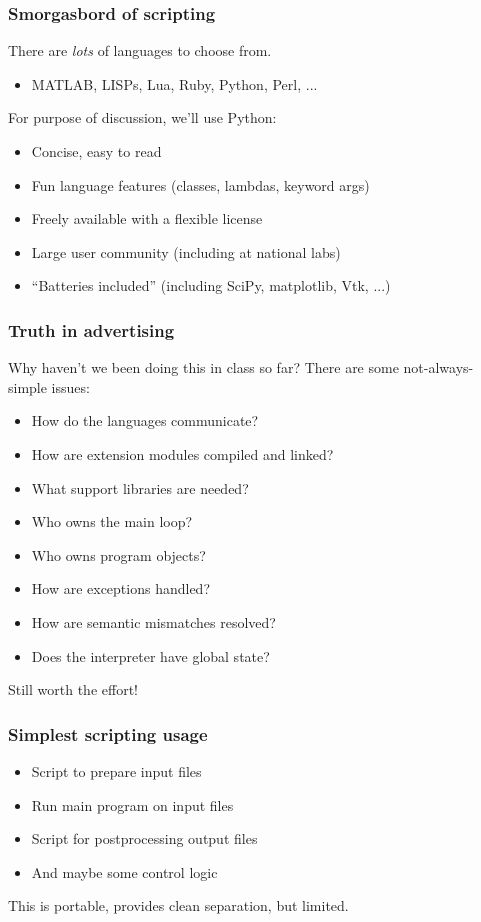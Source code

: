 \documentclass{beamer}
\begin{document}
\begin{frame}
  \frametitle{Smorgasbord of scripting}

  There are {\em lots} of languages to choose from.
  \begin{itemize}
  \item MATLAB, LISPs, Lua, Ruby, Python, Perl, ...
  \end{itemize}

  \vspace{1cm}
  For purpose of discussion, we'll use Python:
  \begin{itemize}
  \item Concise, easy to read
  \item Fun language features (classes, lambdas, keyword args)
  \item Freely available with a flexible license
  \item Large user community (including at national labs)
  \item ``Batteries included'' (including SciPy, matplotlib, Vtk, ...)
  \end{itemize}
\end{frame}


\begin{frame}
  \frametitle{Truth in advertising}

  Why haven't we been doing this in class so far?
  There are some not-always-simple issues:
  \begin{itemize}
  \item How do the languages communicate?
  \item How are extension modules compiled and linked?
  \item What support libraries are needed?
  \item Who owns the main loop?
  \item Who owns program objects?
  \item How are exceptions handled?
  \item How are semantic mismatches resolved?
  \item Does the interpreter have global state?
  \end{itemize}

  \vspace{5mm}
  Still worth the effort!
\end{frame}


\begin{frame}
  \frametitle{Simplest scripting usage}

  \begin{itemize}
  \item Script to prepare input files
  \item Run main program on input files
  \item Script for postprocessing output files
  \item And maybe some control logic
  \end{itemize}

  \vspace{1cm}
  This is portable, provides clean separation, but limited.
  
\end{frame}
\end{document}
